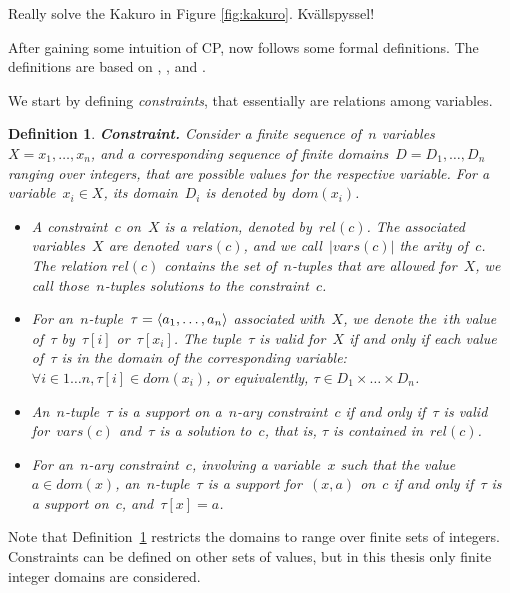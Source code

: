 \documentclass[a4paper,11pt]{article}
\newtheorem{definition}{Definition}
\newcommand{\Todo}[1]{{\color{blue}#1}}
\numberwithin{equation}{section}
\begin{document}
\Todo{Really solve the Kakuro in Figure \ref{fig:kakuro}. Kvällspyssel!}

\smallskip 

After gaining some intuition of CP, now follows some formal definitions.
The definitions are based on
\cite{SchulteCarlsson:FDsys}, \cite{Apt:constraintsBook}, and \cite{Gecode:MPG}.

We start by defining \emph{constraints}, that essentially are relations
among variables.

\begin{definition}
  \label{def:constraint}
  \textbf{Constraint.} Consider a finite sequence of~$n$ 
  variables~$X = x_1,\ldots,x_n$, and a corresponding sequence of
  finite \emph{domains}~$D = D_1,\ldots,D_n$ ranging over integers,
  that are possible values for the
  respective variable. 
  For a variable~$x_i \in X$, its domain~$D_i$ is denoted 
  by~$dom(x_i)$.
  \begin{itemize}
    \item   A \emph{constraint}~$c$ on~$X$ is a relation, 
      denoted by~$rel(c)$. The associated variables~$X$ are denoted~$vars(c)$,
      and we call~$|vars(c)|$ the \emph{arity} of~$c$. The relation
      $rel(c)$ contains the set of~$n$-tuples that are allowed
      for~$X$, we call those~$n$-tuples \emph{solutions} to the constraint~$c$.
    \item   For an~$n$-tuple~$\tau = \left\langle a_1,\ldots,a_n\right\rangle$ associated with~$X$, we
      denote the~$i$th value of~$\tau$ by~$\tau[i]$ or~$\tau[x_i]$. The 
      tuple~$\tau$ is \emph{valid} for~$X$
      if and only if each value of~$\tau$ is in the domain of the corresponding
      variable: $\forall i \in 1 \ldots n, \tau[i] \in dom(x_i)$, or equivalently,
      $\tau \in D_1 \times \ldots \times D_n$.
    \item An~$n$-tuple~$\tau$ is a \emph{support} on a~$n$-ary constraint~$c$ if and only
      if~$\tau$ is valid for~$vars(c)$ and~$\tau$ is a solution to~$c$, that is,
      $\tau$ is contained in~$rel(c)$.
    \item For an~$n$-ary constraint~$c$, involving a variable~$x$ such that
      the value~$a \in dom(x)$, an~$n$-tuple~$\tau$ is a 
      \emph{support for}~$(x,a)$ on~$c$ if and only if~$\tau$ is a support on~$c$,
      and~$\tau[x] = a$.
    \end{itemize}
\end{definition}

Note that Definition~\ref{def:constraint} restricts the domains to range
over finite sets of integers. Constraints can be defined on
other sets of values, but in this thesis only finite integer domains
are considered.
\end{document}
